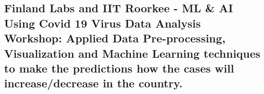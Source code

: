 \documentclass{article}
\begin{document}
\subsection{\textbf{Finland Labs and IIT Roorkee - ML \& AI Using Covid 19 Virus Data Analysis Workshop:}
    \textmd{Applied Data Pre-processing, Visualization and Machine Learning techniques to make the predictions how the cases will increase/decrease in the country. } }








\end{document}
